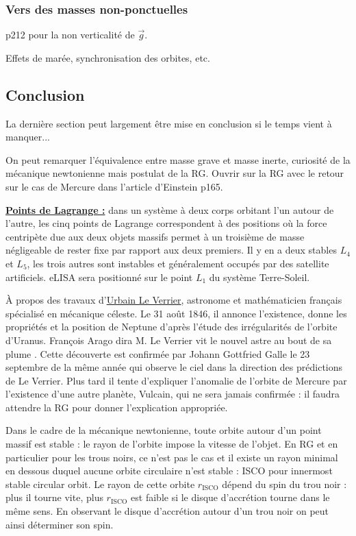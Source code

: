 \subsubsection{Vers des masses non-ponctuelles}

\cite{Sanz2016} p212 pour la non verticalité de $\overrightarrow{g}$.

Effets de marée, synchronisation des orbites, etc.

\subsection*{Conclusion}

La dernière section peut largement être mise en conclusion si le temps vient à manquer...

On peut remarquer l'équivalence entre masse grave et masse inerte, curiosité de la mécanique newtonienne mais postulat de la RG.
Ouvrir sur la RG avec le retour sur le cas de Mercure dans l'article d'Einstein \cite{Faroux1996} p165.

\begin{remarque}
\href{https://fr.wikipedia.org/wiki/Point_de_Lagrange}{\textbf{Points de Lagrange :}} dans un système à deux corps orbitant l'un autour de l'autre, les cinq points de Lagrange correspondent à des positions où la force centripète due aux deux objets massifs permet à un troisième de masse négligeable de rester fixe par rapport aux deux premiers.
Il y en a deux stables $L_4$ et $L_5$, les trois autres sont instables et généralement occupés par des satellite artificiels.
eLISA sera positionné sur le point $L_1$ du système Terre-Soleil.
\end{remarque}

\begin{funfact}
À propos des travaux d'\href{https://fr.wikipedia.org/wiki/Urbain_Le_Verrier}{Urbain Le Verrier}, astronome et mathématicien français spécialisé en mécanique céleste.
Le 31 août 1846, il annonce l'existence, donne les propriétés et la position de Neptune d'après l'étude des irrégularités de l'orbite d'Uranus.
François Arago dira \og M. Le Verrier vit le nouvel astre au bout de sa plume \fg{}. 
Cette découverte est confirmée par Johann Gottfried Galle le 23 septembre de la même année qui observe le ciel dans la direction des prédictions de Le Verrier.
Plus tard il tente d'expliquer l'anomalie de l'orbite de Mercure par l'existence d'une autre planète, Vulcain, qui ne sera jamais confirmée : il faudra attendre la RG pour donner l'explication appropriée.

\noindent
Dans le cadre de la mécanique newtonienne, toute orbite autour d'un point massif est stable : le rayon de l'orbite impose la vitesse de l'objet.
En RG et en particulier pour les trous noirs, ce n'est pas le cas et il existe un rayon minimal en dessous duquel aucune orbite circulaire n'est stable : ISCO pour innermost stable circular orbit.
Le rayon de cette orbite $r_\mathrm{ISCO}$ dépend du spin du trou noir : plus il tourne vite, plus $r_\mathrm{ISCO}$ est faible si le disque d'accrétion tourne dans le même sens.
En observant le disque d'accrétion autour d'un trou noir on peut ainsi déterminer son spin.
\end{funfact}

\newpage